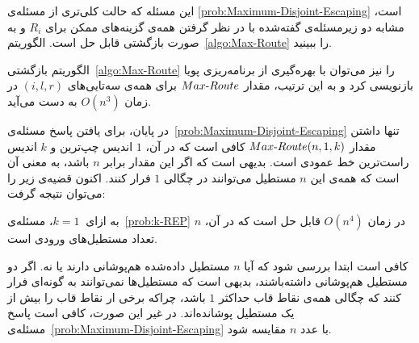 این مسئله که حالت کلی‌تری از مسئله‌ی \ref{prob:Maximum-Disjoint-Escaping} است، مشابه دو زیر‌مسئله‌ی گفته‌شده با در نظر گرفتن همه‌ی گزینه‌های ممکن برای $R_{i}$ و به صورت بازگشتی قابل حل است. الگوریتم~\ref{algo:Max-Route} را ببینید.

الگوریتم بازگشتی~\ref{algo:Max-Route} را نیز می‌توان با بهره‌گیری از برنامه‌ریزی پویا بازنویسی کرد و به این ترتیب، مقدار $Max \mbox{-} Route$ برای همه‌ی سه‌تایی‌های $(i, l, r)$ در زمان $O(n ^ 3)$ به دست می‌آید.

در پایان، برای یافتن پاسخ مسئله‌ی~\ref{prob:Maximum-Disjoint-Escaping} تنها داشتن مقدار $Max \mbox{-} Route (n, 1, k)$ کافی است که در آن، $1$ اندیس چپ‌ترین و $k$ اندیس راست‌ترین خط عمودی است. بدیهی است که اگر این مقدار برابر $n$ باشد، به معنی آن است که همه‌ی این $n$ مستطیل می‌توانند در چگالی $1$ فرار کنند. اکنون قضیه‌ی زیر را می‌توان نتیجه گرفت:


به ازای $k = 1\ $، مسئله‌ی~\ref{prob:k-REP} در زمان $O(n ^ 4)$ قابل حل است که در آن، $n$ تعداد مستطیل‌های ورودی است.



کافی است ابتدا بررسی شود که آیا $n$ مستطیل داده‌شده هم‌پوشانی دارند یا نه. اگر دو مستطیل هم‌پوشانی داشته‌باشند، بدیهی است که مستطیل‌ها نمی‌توانند به گونه‌ای فرار کنند که چگالی همه‌ی نقاط قاب حد‌اکثر $1$ باشد، چراکه برخی ار نقاط قاب را بیش از یک مستطیل پوشانده‌اند. در غیر این صورت، کافی است پاسخ مسئله‌ی~\ref{prob:Maximum-Disjoint-Escaping} با عدد $n$ مقایسه شود.

